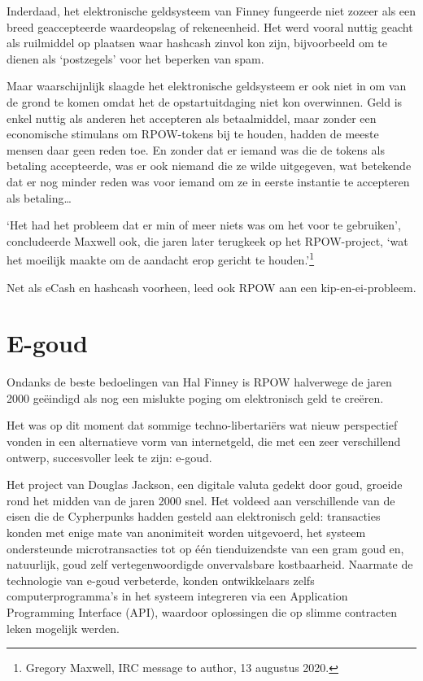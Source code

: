 \documentclass[
  a5paper,
  smalldemyvopaper,11pt,twoside,onecolumn,openright,extrafontsizes]{memoir}
\begin{document}
Inderdaad, het elektronische geldsysteem van Finney fungeerde niet
zozeer als een breed geaccepteerde waardeopslag of rekeneenheid. Het
werd vooral nuttig geacht als ruilmiddel op plaatsen waar hashcash
zinvol kon zijn, bijvoorbeeld om te dienen als `postzegels' voor het
beperken van spam.

Maar waarschijnlijk slaagde het elektronische geldsysteem er ook niet in
om van de grond te komen omdat het de opstartuitdaging niet kon
overwinnen. Geld is enkel nuttig als anderen het accepteren als
betaalmiddel, maar zonder een economische stimulans om RPOW-tokens bij
te houden, hadden de meeste mensen daar geen reden toe. En zonder dat er
iemand was die de tokens als betaling accepteerde, was er ook niemand
die ze wilde uitgegeven, wat betekende dat er nog minder reden was voor
iemand om ze in eerste instantie te accepteren als betaling\ldots{}

`Het had het probleem dat er min of meer niets was om het voor te
gebruiken', concludeerde Maxwell ook, die jaren later terugkeek op het
RPOW-project, `wat het moeilijk maakte om de aandacht erop gericht te
houden.'\footnote{Gregory Maxwell, IRC message to author, 13 augustus
  2020.}

Net als eCash en hashcash voorheen, leed ook RPOW aan een
kip-en-ei-probleem.

\section{E-goud}\label{e-goud}

Ondanks de beste bedoelingen van Hal Finney is RPOW halverwege de jaren
2000 geëindigd als nog een mislukte poging om elektronisch geld te
creëren.

Het was op dit moment dat sommige techno-libertariërs wat nieuw
perspectief vonden in een alternatieve vorm van internetgeld, die met
een zeer verschillend ontwerp, succesvoller leek te zijn: e-goud.

Het project van Douglas Jackson, een digitale valuta gedekt door goud,
groeide rond het midden van de jaren 2000 snel. Het voldeed aan
verschillende van de eisen die de Cypherpunks hadden gesteld aan
elektronisch geld: transacties konden met enige mate van anonimiteit
worden uitgevoerd, het systeem ondersteunde microtransacties tot op één
tienduizendste van een gram goud en, natuurlijk, goud zelf
vertegenwoordigde onvervalsbare kostbaarheid. Naarmate de technologie
van e-goud verbeterde, konden ontwikkelaars zelfs computerprogramma's in
het systeem integreren via een Application Programming Interface (API),
waardoor oplossingen die op slimme contracten leken mogelijk werden.
\end{document}
